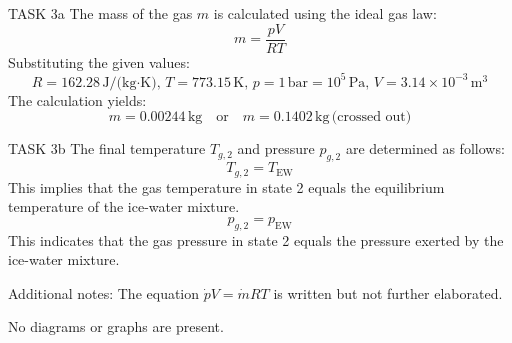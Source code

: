 TASK 3a  
The mass of the gas \( m \) is calculated using the ideal gas law:  
\[
m = \frac{p V}{R T}
\]  
Substituting the given values:  
\[
R = 162.28 \, \text{J/(kg·K)}, \, T = 773.15 \, \text{K}, \, p = 1 \, \text{bar} = 10^5 \, \text{Pa}, \, V = 3.14 \times 10^{-3} \, \text{m}^3
\]  
The calculation yields:  
\[
m = 0.00244 \, \text{kg} \quad \text{or} \quad m = 0.1402 \, \text{kg} \, \text{(crossed out)}
\]  

TASK 3b  
The final temperature \( T_{g,2} \) and pressure \( p_{g,2} \) are determined as follows:  
\[
T_{g,2} = T_{\text{EW}}
\]  
This implies that the gas temperature in state 2 equals the equilibrium temperature of the ice-water mixture.  
\[
p_{g,2} = p_{\text{EW}}
\]  
This indicates that the gas pressure in state 2 equals the pressure exerted by the ice-water mixture.  

Additional notes:  
The equation \( \dot{p} V = \dot{m} R T \) is written but not further elaborated.  

No diagrams or graphs are present.